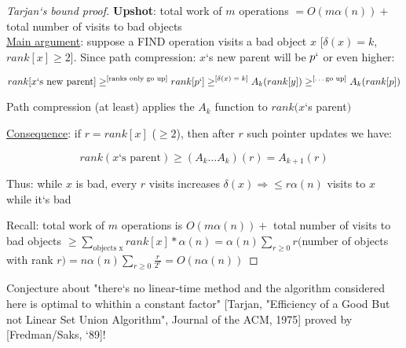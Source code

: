 \documentclass[a4paper,12pt]{article}
\theoremstyle{plain}
\theoremstyle{definition}
\theoremstyle{remark}
\begin{document}
\begin{proof}[Tarjan`s bound proof]
\textbf{Upshot}: total work of $m$ operations $= O(m \alpha(n)) +$ total number of visits to bad objects
\\

\underline{Main argument}: suppose a FIND operation visits a bad object $x$ [$\delta(x) = k$, $rank[x] \geq 2$]. Since path compression: $x$`s new parent will be $p`$ or even higher:

\[
rank[x\text{`s new parent}] \geq^{\text{[ranks only go up]}} rank[p`] \geq^{\text{[$\delta(x) = k$]}} A_k(rank[y]) \geq^{\text{[$\dots$go up]}} A_k(rank[p])
\]

Path compression (at least) applies the $A_k$ function to $rank(x$`s parent$)$

\underline{Consequence}: if $r = rank[x]$ ($\geq 2$), then after $r$ such pointer updates we have:

\[
rank(x\text{`s parent}) \geq (A_k \dots A_k)(r) = A_{k+1}(r)
\]

Thus: while $x$ is bad, every $r$ visits increases $\delta(x) \Rightarrow \leq r \alpha(n)$ visits to $x$ while it`s bad

Recall: total work of $m$ operations is $O(m \alpha(n)) +$ total number of visits to bad objects $\geq \sum\limits_{\text{objects x}} rank[x]*\alpha(n) = \alpha(n) \sum\limits_{r \geq 0} r ($number of objects with rank $r) = n \alpha(n) \sum\limits_{r \geq 0} \frac{r}{2^r} = O(n \alpha(n))$
\end{proof}

Conjecture about "there`s no linear-time method and the algorithm considered here is optimal to whithin a constant factor" [Tarjan, "Efficiency of a Good But not Linear Set Union Algorithm", Journal of the ACM, 1975] proved by [Fredman/Saks, `89]!
\end{document}

